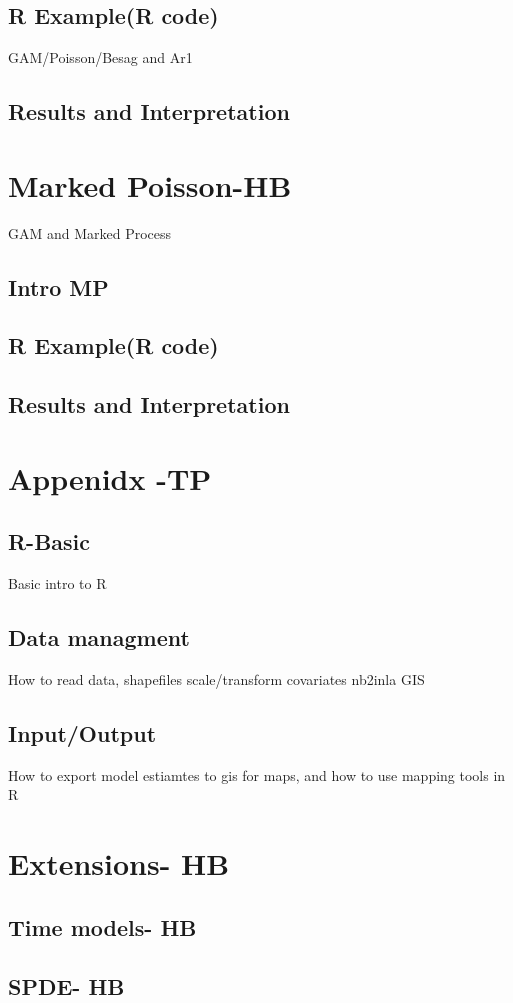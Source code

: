 \documentclass[12pt,a4paper]{article}
\begin{document}
\subsection{R Example(R code)}
GAM/Poisson/Besag and Ar1
\subsection{Results and Interpretation}


\section{Marked Poisson-HB}

GAM and Marked Process

\subsection{Intro MP}
\subsection{R Example(R code)}
\subsection{Results and Interpretation}



\section*{Appenidx -TP}

\subsection*{R-Basic}

Basic intro to R


\subsection*{Data managment}


How to read data, shapefiles 
scale/transform covariates
nb2inla
GIS 
\subsection*{Input/Output}


How to export model estiamtes to gis for maps, and how to use mapping tools in R


\section*{Extensions- HB}


\subsection*{Time models- HB}
\subsection*{SPDE- HB}





 
\end{document}

